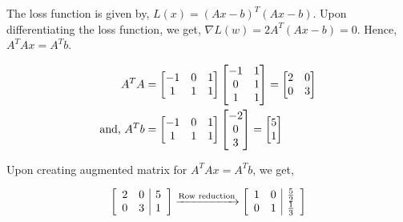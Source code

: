 \documentclass{article}
\begin{document}
        The loss function is given by, \(L(x)=(Ax-b)^T(Ax-b)\). Upon differentiating the loss function, we get, \(\nabla L(w)=2A^T(Ax-b)=0\). Hence, \(A^TAx=A^Tb\).

        \begin{align*}
            A^TA&=\begin{bmatrix}
                -1 & 0 & 1\\
                1 & 1 & 1
            \end{bmatrix}\begin{bmatrix}
                -1 & 1\\
                0 & 1\\
                1 & 1
            \end{bmatrix}=\begin{bmatrix}
                2 & 0\\
                0 & 3
            \end{bmatrix}\\
            \textnormal{and, }
            A^Tb&=\begin{bmatrix}
                -1 & 0 & 1\\
                1 & 1 & 1
            \end{bmatrix}\begin{bmatrix}
                -2\\
                0\\
                3
            \end{bmatrix}=\begin{bmatrix}
                5\\
                1
            \end{bmatrix}
        \end{align*}

        Upon creating augmented matrix for \(A^TAx=A^Tb\), we get,

        \begin{align*}
            \left[
                \begin{array}{cc|c}
                    2 & 0 & 5\\
                    0 & 3 & 1
                \end{array}
            \right]\xrightarrow{\textnormal{Row reduction}}
            \left[
                \begin{array}{cc|c}
                    1 & 0 & \frac{5}{2}\\
                    0 & 1 & \frac13
                \end{array}
            \right]
        \end{align*}
\end{document}

